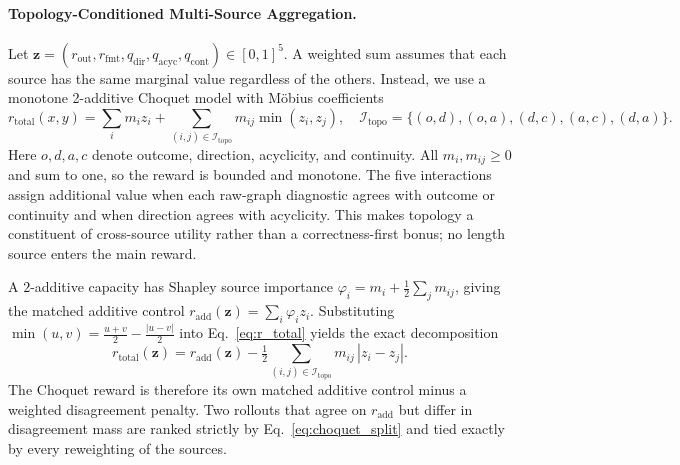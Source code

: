 \paragraph{Topology-Conditioned Multi-Source Aggregation.}
Let $\mathbf{z}=(r_{\mathrm{out}},r_{\mathrm{fmt}},q_{\mathrm{dir}},q_{\mathrm{acyc}},q_{\mathrm{cont}})\in[0,1]^5$. A weighted sum assumes that each source has the same marginal value regardless of the others. Instead, we use a monotone 2-additive Choquet model with M\"obius coefficients~\citep{choquet1954capacities,grabisch1997kadditive}
\begin{equation}
\label{eq:r_total}
r_{\mathrm{total}}(x,y)
=\sum_i m_i z_i
+\sum_{(i,j)\in\mathcal{I}_{\mathrm{topo}}}m_{ij}\min(z_i,z_j),
\quad
\mathcal{I}_{\mathrm{topo}}=\{(o,d),(o,a),(d,c),(a,c),(d,a)\}.
\end{equation}
Here $o,d,a,c$ denote outcome, direction, acyclicity, and continuity. All $m_i,m_{ij}\ge0$ and sum to one, so the reward is bounded and monotone. The five interactions assign additional value when each raw-graph diagnostic agrees with outcome or continuity and when direction agrees with acyclicity. This makes topology a constituent of cross-source utility rather than a correctness-first bonus; no length source enters the main reward.

\begin{remark}
\label{rem:choquet_sep}
A $2$-additive capacity has Shapley source importance $\varphi_i=m_i+\tfrac12\sum_j m_{ij}$, giving the matched additive control $r_{\mathrm{add}}(\mathbf{z})=\sum_i\varphi_i z_i$. Substituting $\min(u,v)=\tfrac{u+v}{2}-\tfrac{|u-v|}{2}$ into Eq.~\ref{eq:r_total} yields the exact decomposition
\begin{equation}
\label{eq:choquet_split}
r_{\mathrm{total}}(\mathbf{z})=r_{\mathrm{add}}(\mathbf{z})-\tfrac12\!\!\sum_{(i,j)\in\mathcal{I}_{\mathrm{topo}}}\!\! m_{ij}\,|z_i-z_j|.
\end{equation}
The Choquet reward is therefore its own matched additive control minus a weighted disagreement penalty. Two rollouts that agree on $r_{\mathrm{add}}$ but differ in disagreement mass are ranked strictly by Eq.~\ref{eq:choquet_split} and tied exactly by every reweighting of the sources.
\end{remark}

